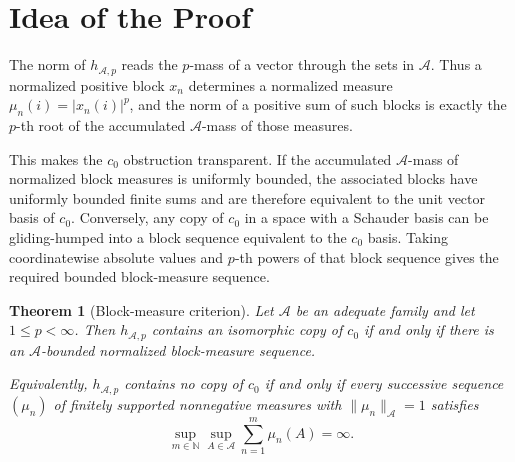 \documentclass[11pt]{article}
\newtheorem{theorem}{Theorem}
\newcommand{\N}{\mathbb N}
\newcommand{\A}{\mathcal A}
\begin{document}
\section*{Idea of the Proof}

The norm of \(h_{\A,p}\) reads the \(p\)-mass of a vector through the sets in
\(\A\). Thus a normalized positive block \(x_n\) determines a normalized
measure \(\mu_n(i)=|x_n(i)|^p\), and the norm of a positive sum of such blocks
is exactly the \(p\)-th root of the accumulated \(\A\)-mass of those measures.

This makes the \(c_0\) obstruction transparent. If the accumulated
\(\A\)-mass of normalized block measures is uniformly bounded, the associated
blocks have uniformly bounded finite sums and are therefore equivalent to the
unit vector basis of \(c_0\). Conversely, any copy of \(c_0\) in a space with a
Schauder basis can be gliding-humped into a block sequence equivalent to the
\(c_0\) basis. Taking coordinatewise absolute values and \(p\)-th powers of
that block sequence gives the required bounded block-measure sequence.

\begin{theorem}[Block-measure criterion]\label{thm:blockmeasure}
Let \(\A\) be an adequate family and let \(1\leq p<\infty\). Then
\(h_{\A,p}\) contains an isomorphic copy of \(c_0\) if and only if there is an
\(\A\)-bounded normalized block-measure sequence.

Equivalently, \(h_{\A,p}\) contains no copy of \(c_0\) if and only if every
successive sequence \((\mu_n)\) of finitely supported nonnegative measures with
\(\|\mu_n\|_{\A}=1\) satisfies
\[
  \sup_{m\in\N}\sup_{A\in\A}\sum_{n=1}^{m}\mu_n(A)=\infty.
\]
\end{theorem}
\end{document}
